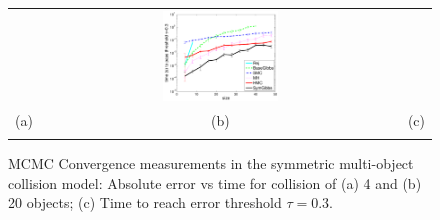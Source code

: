 \documentclass[]{article}
\newcommand{\nnn}{0.33}
\newcommand{\nnh}{0.23}
\begin{document}
\begin{figure}[t!]
\begin{center}
\begin{tabular}{ccc}
& \hspace{-3mm} \includegraphics[width=\nnn\textwidth, height=\nnh\textwidth]{plotsx/collisionx/time_vs_param-errorbar.pdf}%
\vspace{-1.5mm}
\\
\hspace{-5mm} \footnotesize(a) 
& \hspace{-4mm} \footnotesize(b) 
& \hspace{-3mm} \footnotesize(c) \\
\multicolumn{3}{c}{}
\end{tabular}
\end{center}
\vspace{-8mm}
\caption{\footnotesize 
MCMC Convergence measurements in the symmetric multi-object collision model: 
Absolute error vs time for collision of (a) 4 and (b) 20 objects; (c) Time to reach error threshold $\tau=0.3$.}
\label{fig:multi-object.mom}
\vspace{-4mm}
\end{figure}
\end{document}
